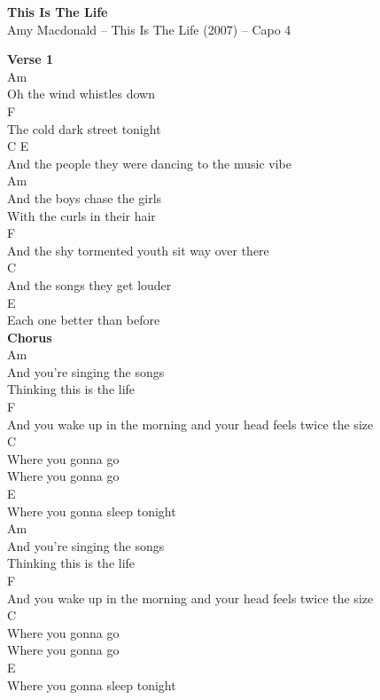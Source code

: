 \documentclass[a4paper]{article}
\begin{document}
    \begin{center}
        \textbf{This Is The Life}
        ~\\
        Amy Macdonald -- This Is The Life (2007)
         -- Capo 4
    \end{center}
    {
        \scriptsize
        \textbf{Verse 1}
        ~\\
        {
            \cutive
            \obeyspaces
Am
\\
Oh the wind whistles down  
\\
    F
\\
The cold dark street tonight
\\
        C                        E
\\
And the people they were dancing to the music vibe
\\
        Am
\\
And the boys chase the girls
\\
With the curls in their hair
\\
        F
\\
And the shy tormented youth sit way over there
\\
        C
\\
And the songs they get louder
\\
                       E
\\
Each one better than before
\\

        }
        \textbf{Chorus}
        ~\\
        {
            \cutive
            \obeyspaces
Am
\\
And you're singing the songs
\\
Thinking this is the life
\\
                       F        
\\
And you wake up in the morning and your head feels twice the size
\\
                C
\\
Where you gonna go
\\
Where you gonna go
\\
                        E
\\
Where you gonna sleep tonight
\\
Am
\\
And you're singing the songs
\\
Thinking this is the life
\\
        F
\\
And you wake up in the morning and your head feels twice the size
\\
C
\\
Where you gonna go
\\
Where you gonna go
\\
                      E
\\
Where you gonna sleep tonight
\\

}}
\end{document}
